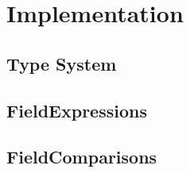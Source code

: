 \chapter{Implementation}

\section{Type System}


\section{FieldExpressions}
\section{FieldComparisons}



